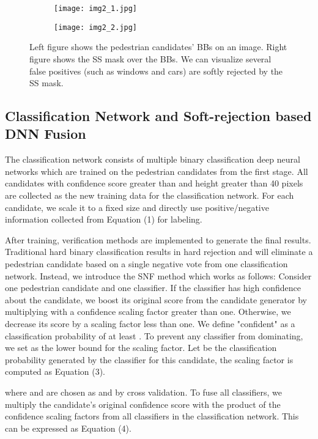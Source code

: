 \documentclass[10pt,letterpaper]{article}
\begin{document}
\begin{figure*}
\begin{subfigure}{.5\textwidth}
  \centering
  \texttt{[image: img2\_1.jpg]}
  \label{fig:sfig1}
\end{subfigure}
\begin{subfigure}{.5\textwidth}
  \centering
  \texttt{[image: img2\_2.jpg]}
  \label{fig:sfig2}
\end{subfigure}
\caption{Left figure shows the pedestrian candidates' BBs on an image. Right figure shows the SS mask over the BBs. We can visualize several false positives (such as windows and cars) are softly rejected by the SS mask.}
\label{fig:fig}
\end{figure*}

\subsection{Classification Network and Soft-rejection based DNN Fusion}
The classification network consists of multiple binary classification deep neural networks which are trained on the pedestrian candidates from the first stage. All candidates with confidence score greater than  and height greater than 40 pixels are collected as the new training data for the classification network. For each candidate, we scale it to a fixed size and directly use positive/negative information collected from Equation (1) for labeling.

After training, verification methods are implemented to generate the final results. Traditional hard binary classification results in hard rejection and will eliminate a pedestrian candidate based on a single negative vote from one classification network. Instead, we introduce the SNF method which works as follows: Consider one pedestrian candidate and one classifier. If the classifier has high confidence about the candidate, we boost its original score from the candidate generator by multiplying with a confidence scaling factor greater than one. Otherwise, we decrease its score by a scaling factor less than one. We define "confident" as a classification probability of at least . To prevent any classifier from dominating, we set  as the lower bound for the scaling factor. Let  be the classification probability generated by the  classifier for this candidate, the scaling factor is computed as Equation (3).

where  and  are chosen as  and  by cross validation. To fuse all  classifiers, we multiply the candidate's original confidence score with the product of the confidence scaling factors from all classifiers in the classification network.
This can be expressed as Equation (4).
\end{document}
